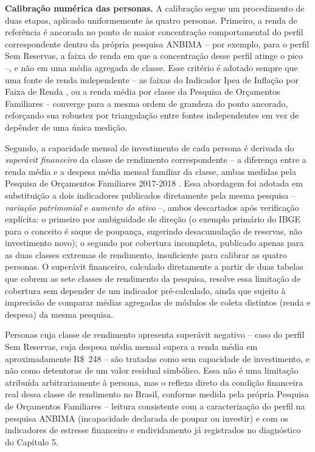\textbf{Calibra\c{c}\~ao num\'erica das personas.} A calibra\c{c}\~ao
segue um procedimento de duas etapas, aplicado uniformemente \`as
quatro personas. Primeiro, a renda de refer\^encia \'e ancorada no
ponto de maior concentra\c{c}\~ao comportamental do perfil
correspondente dentro da pr\'opria pesquisa ANBIMA -- por exemplo, para
o perfil Sem Reservas, a faixa de renda em que a concentra\c{c}\~ao
desse perfil atinge o pico --, e n\~ao em uma m\'edia agregada de
classe. Esse crit\'erio \'e adotado sempre que uma fonte de renda
independente -- as faixas do Indicador Ipea de Infla\c{c}\~ao por
Faixa de Renda \autocite{ipea2026rendafaixa}, ou a renda m\'edia por
classe da Pesquisa de Or\c{c}amentos Familiares
\autocite{ibge2019pof} -- converge para a mesma ordem de grandeza do
ponto ancorado, reforçando sua robustez por triangula\c{c}\~ao entre
fontes independentes em vez de dep\^ender de uma \'unica medi\c{c}\~ao.

Segundo, a capacidade mensal de investimento de cada persona \'e
derivada do \textit{super\'avit financeiro} da classe de rendimento
correspondente -- a diferen\c{c}a entre a renda m\'edia e a despesa
m\'edia mensal familiar da classe, ambas medidas pela Pesquisa de
Or\c{c}amentos Familiares 2017-2018 \autocite{ibge2019pof}. Essa
abordagem foi adotada em substitui\c{c}\~ao a dois indicadores
publicados diretamente pela mesma pesquisa -- \textit{varia\c{c}\~ao
patrimonial} e \textit{aumento do ativo} --, ambos descartados ap\'os
verifica\c{c}\~ao expl\'icita: o primeiro por ambiguidade de dire\c{c}\~ao
(o exemplo prim\'ario do IBGE para o conceito \'e saque de poupan\c{c}a,
sugerindo desacumula\c{c}\~ao de reservas, n\~ao investimento novo); o
segundo por cobertura incompleta, publicado apenas para as duas
classes extremas de rendimento, insuficiente para calibrar as quatro
personas. O super\'avit financeiro, calculado diretamente a partir de
duas tabelas que cobrem as sete classes de rendimento da pesquisa,
resolve essa limita\c{c}\~ao de cobertura sem depender de um indicador
pr\'e-calculado, ainda que sujeito \`a imprecis\~ao de comparar m\'edias
agregadas de m\'odulos de coleta distintos (renda e despesa) da mesma
pesquisa.

Personas cuja classe de rendimento apresenta super\'avit negativo --
caso do perfil Sem Reservas, cuja despesa m\'edia mensal supera a
renda m\'edia em aproximadamente R\$~248 -- s\~ao tratadas como sem
capacidade de investimento, e n\~ao como detentoras de um valor
residual simb\'olico. Essa n\~ao \'e uma limita\c{c}\~ao atribu\'ida
arbitrariamente \`a persona, mas o reflexo direto da condi\c{c}\~ao
financeira real dessa classe de rendimento no Brasil, conforme medida
pela pr\'opria Pesquisa de Or\c{c}amentos Familiares -- leitura
consistente com a caracteriza\c{c}\~ao do perfil na pesquisa ANBIMA
(incapacidade declarada de poupar ou investir) e com os indicadores de
estresse financeiro e endividamento j\'a registrados no diagn\'ostico
do Cap\'itulo 5.

